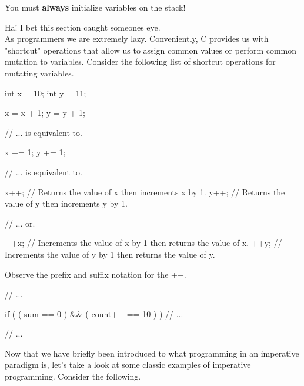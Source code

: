 You must \textbf{always} initialize variables on the stack!\\



Ha! I bet this section caught someones eye.\\

As programmers we are extremely lazy. Conveniently, C provides us with "shortcut" operations that allow us to assign common values or perform common mutation to variables. Consider the following list of shortcut operations for mutating variables.\\

\begin{code}[c]
int x = 10;
int y = 11;

x = x + 1;
y = y + 1;

// ... is equivalent to.

x += 1;
y += 1;

// ... is equivalent to.

x++; // Returns the value of x then increments x by 1.
y++; // Returns the value of y then increments y by 1.

// ... or.

++x; // Increments the value of x by 1 then returns the value of x.
++y; // Increments the value of y by 1 then returns the value of y.
\end{code}

Observe the prefix and suffix notation for the ++.\\


\begin{code}[c]
// ...

if ( ( sum == 0 ) && ( count++ == 10 ) ) {
	// ...
}

// ...
\end{code}


Now that we have briefly been introduced to what programming in an imperative paradigm is, let's take a look at some classic examples of imperative programming. Consider the following.\\


